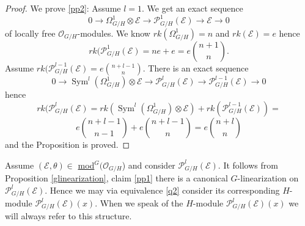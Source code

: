 \documentclass{amsart}
\theoremstyle{plain}
\theoremstyle{definition}
\theoremstyle{remark}
\numberwithin{equation}{theorem}
\begin{document}
\begin{proof}
We prove \ref{pp2}: Assume $l=1$. We get an exact sequence
\[ 0\rightarrow \Omega^1_{G/H}\otimes {\mathcal{E}} \rightarrow
{\mathcal{P} }^1_{G/H}({\mathcal{E}})\rightarrow {\mathcal{E}} \rightarrow 0 \]
of locally free ${\mathcal{O} }_{G/H}$-modules. We know $rk(\Omega^1_{G/H})=n $ and
$rk({\mathcal{E}})=e$ hence
\[ rk({\mathcal{P} }^1_{G/H}({\mathcal{E}})=ne+e=e\binom{n+1}{n}.\]
 Assume $rk({\mathcal{P} }^{l-1}_{G/H}({\mathcal{E}})=e\binom{n+l-1}{n}$.
There is an exact sequence
\[ 0\rightarrow {\operatorname{Sym} }^l(\Omega^1_{G/H})\otimes {\mathcal{E}} \rightarrow
{\mathcal{P} }^l_{G/H}({\mathcal{E}})\rightarrow {\mathcal{P} }^{l-1}_{G/H}({\mathcal{E}}) \rightarrow 0 \]
hence
\[rk({\mathcal{P} }^l_{G/H}({\mathcal{E}})=rk( {\operatorname{Sym} }^l(\Omega^1_{G/H})\otimes {\mathcal{E}}
)+rk({\mathcal{P} }^{l-1}_{G/H}({\mathcal{E}})
)=\]
\[ e\binom{n+l-1}{n-1}+e\binom{n+l-1}{n}=e\binom{n+l}{n}\]
and the Proposition is proved.
\end{proof}

Assume $({\mathcal{E}} ,\theta)\in$ {\underline{mod}$^G({\mathcal{O} }_{G/H}$) }  and consider ${\mathcal{P} }^l_{G/H}({\mathcal{E}})$. It
follows from Proposition \ref{glinearization}, claim \ref{pp1}  there is a canonical
$G$-linearization on ${\mathcal{P} }^l_{G/H}({\mathcal{E}})$. Hence we may via
equivalence \ref{q2} consider its corresponding $H$-module
${\mathcal{P} }^l_{G/H}({\mathcal{E}})(x)$. When we speak of the $H$-module
${\mathcal{P} }^l_{G/H}({\mathcal{E}})(x)$ we will always refer to this structure.
\end{document}
